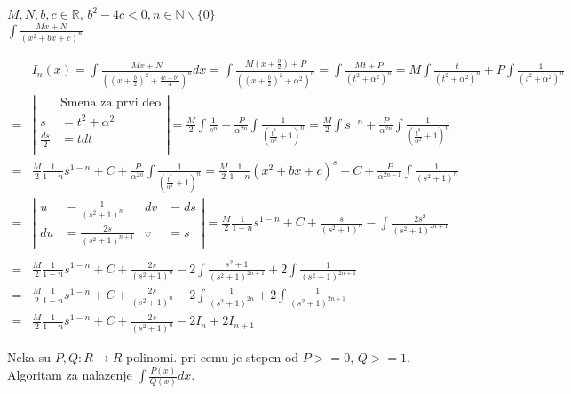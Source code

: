 \documentclass{article}
\begin{document}
\begin{primbox}
    $M, N, b, c \in \mathbb{R}$,
    $b^2 - 4c < 0, n \in \mathbb{N}\backslash\{0\}$\\
    $\int \frac{Mx + N}{(x^2 + bx + c)^n}$
\end{primbox}
\begin{align*}
      & I_n (x) = \int \frac{Mx + N}{((x+\frac{b}{2})^2 + \frac{4c-b^2}{4})^n}dx
    = \int \frac{M(x+\frac{b}{2}) + P}{((x+\frac{b}{2})^2 + \alpha^2)^n}
    = \int \frac{Mt + P}{(t^2 + \alpha ^2)^n}
    = M\int\frac{t}{(t^2+\alpha^2)^n} + P\int\frac{1}{(t^2 + \alpha^2)^n}                                                           \\
    = & \left | \begin{alignedat}{3}
                                 & \text{Smena za prvi deo} \\
                    s            & = t^2 + \alpha^2         \\
                    \frac{ds}{2} & = t dt                   \\
                \end{alignedat} \right |
    = \frac{M}{2} \int \frac{1}{s^n} + \frac{P}{\alpha^{2n}}\int\frac{1}{(\frac{t^2}{\alpha^2} + 1)^n}=
    \frac{M}{2}\int s^{-n} + \frac{P}{\alpha^{2n}}\int\frac{1}{(\frac{t^2}{\alpha^2} + 1)^n}                                        \\ = &
    \frac{M}{2} \frac{1}{1-n}s^{1-n} + C + \frac{P}{\alpha^{2n}}\int\frac{1}{(\frac{t^2}{\alpha^2} + 1)^n}
    = \frac{M}{2}\frac{1}{1-n}(x^2+bx + c)^s + C + \frac{P}{\alpha^{2n-1}}\int\frac{1}{(s^2 + 1)^n}                                 \\
    = & \left | \begin{alignedat}{2}
                    u  & = \frac{1}{(s^2+1)^n}      & dv & = ds \\
                    du & = \frac{2s}{(s^2+1)^{n+1}} & v  & = s
                \end{alignedat} \right |
    = \frac{M}{2} \frac{1}{1-n}s^{1-n} + C + \frac{s}{(s^2 + 1)^n} - \int\frac{2s^2}{(s^2+1)^{2n+1}}                                \\
    \\ = & \frac{M}{2} \frac{1}{1-n}s^{1-n} + C + \frac{2s}{(s^2 + 1)^n} - 2\int\frac{s^2 + 1}{(s^2+1)^{2n+1}} + 2\int\frac{1}{(s^2+1)^{2n+1}}\\
    = & \frac{M}{2} \frac{1}{1-n}s^{1-n} + C + \frac{2s}{(s^2 + 1)^n} - 2\int\frac{1}{(s^2+1)^{2n}} + 2\int\frac{1}{(s^2+1)^{2n+1}} \\
    = & \frac{M}{2} \frac{1}{1-n}s^{1-n} + C + \frac{2s}{(s^2 + 1)^n} - 2I_n + 2I_{n+1}
\end{align*}
\begin{primbox}
    Neka su $P, Q: R \longrightarrow R$ polinomi. pri cemu je stepen od $P >= 0$, $Q >= 1$.
    Algoritam za nalazenje $\int \frac{P(x)}{Q(x)}dx$.
\end{primbox}
\end{document}
